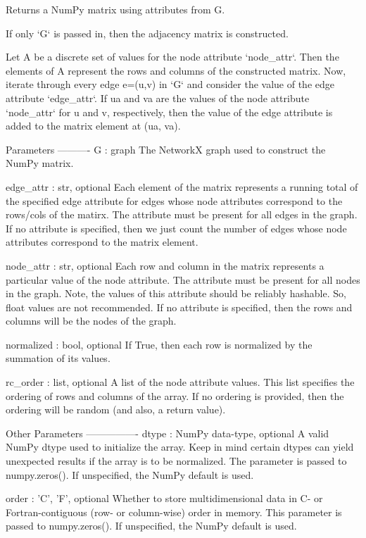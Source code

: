 \begin{DoxyVerb}Returns a NumPy matrix using attributes from G.

If only `G` is passed in, then the adjacency matrix is constructed.

Let A be a discrete set of values for the node attribute `node_attr`. Then
the elements of A represent the rows and columns of the constructed matrix.
Now, iterate through every edge e=(u,v) in `G` and consider the value
of the edge attribute `edge_attr`.  If ua and va are the values of the
node attribute `node_attr` for u and v, respectively, then the value of
the edge attribute is added to the matrix element at (ua, va).

Parameters
----------
G : graph
    The NetworkX graph used to construct the NumPy matrix.

edge_attr : str, optional
    Each element of the matrix represents a running total of the
    specified edge attribute for edges whose node attributes correspond
    to the rows/cols of the matirx. The attribute must be present for
    all edges in the graph. If no attribute is specified, then we
    just count the number of edges whose node attributes correspond
    to the matrix element.

node_attr : str, optional
    Each row and column in the matrix represents a particular value
    of the node attribute.  The attribute must be present for all nodes
    in the graph. Note, the values of this attribute should be reliably
    hashable. So, float values are not recommended. If no attribute is
    specified, then the rows and columns will be the nodes of the graph.

normalized : bool, optional
    If True, then each row is normalized by the summation of its values.

rc_order : list, optional
    A list of the node attribute values. This list specifies the ordering
    of rows and columns of the array. If no ordering is provided, then
    the ordering will be random (and also, a return value).

Other Parameters
----------------
dtype : NumPy data-type, optional
    A valid NumPy dtype used to initialize the array. Keep in mind certain
    dtypes can yield unexpected results if the array is to be normalized.
    The parameter is passed to numpy.zeros(). If unspecified, the NumPy
    default is used.

order : {'C', 'F'}, optional
    Whether to store multidimensional data in C- or Fortran-contiguous
    (row- or column-wise) order in memory. This parameter is passed to
    numpy.zeros(). If unspecified, the NumPy default is used.


\end{DoxyVerb}
